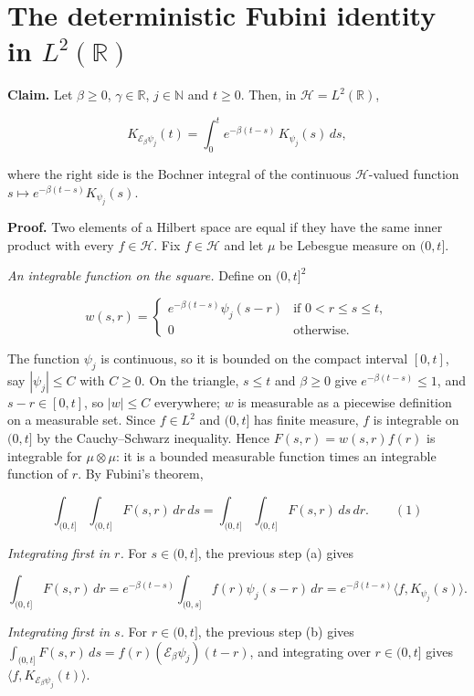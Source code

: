\documentclass[11pt,a4paper]{article}
\begin{document}
\section{\texorpdfstring{The deterministic Fubini identity in \(L^2(\mathbb R)\)}{The deterministic Fubini identity in L²(R)}}


\textbf{Claim.} Let \(\beta\ge0\), \(\gamma\in\mathbb R\), \(j\in\mathbb N\) and \(t\ge0\). Then, in \(\mathcal H=L^2(\mathbb R)\),


\[K_{\mathcal E_\beta\psi_j}(t)=\int_0^te^{-\beta(t-s)}\,K_{\psi_j}(s)\,ds,\]


where the right side is the Bochner integral of the continuous \(\mathcal H\)-valued function \(s\mapsto e^{-\beta(t-s)}K_{\psi_j}(s)\).




\textbf{Proof.} Two elements of a Hilbert space are equal if they have the same inner product with every \(f\in\mathcal H\). Fix \(f\in\mathcal H\) and let \(\mu\) be Lebesgue measure on \((0,t]\).




\emph{An integrable function on the square.} Define on \((0,t]^2\)


\[w(s,r)=\begin{cases}e^{-\beta(t-s)}\psi_j(s-r)&\text{if }0<r\le s\le t,\\0&\text{otherwise.}\end{cases}\]


The function \(\psi_j\) is continuous, so it is bounded on the compact interval \([0,t]\), say \(|\psi_j|\le C\) with \(C\ge0\). On the triangle, \(s\le t\) and \(\beta\ge0\) give \(e^{-\beta(t-s)}\le1\), and \(s-r\in[0,t]\), so \(|w|\le C\) everywhere; \(w\) is measurable as a piecewise definition on a measurable set. Since \(f\in L^2\) and \((0,t]\) has finite measure, \(f\) is integrable on \((0,t]\) by the Cauchy–Schwarz inequality. Hence \(F(s,r)=w(s,r)f(r)\) is integrable for \(\mu\otimes\mu\): it is a bounded measurable function times an integrable function of \(r\). By Fubini's theorem,


\[\int_{(0,t]}\int_{(0,t]}F(s,r)\,dr\,ds=\int_{(0,t]}\int_{(0,t]}F(s,r)\,ds\,dr.\qquad(1)\]


\emph{Integrating first in \(r\).} For \(s\in(0,t]\), the previous step (a) gives


\[\int_{(0,t]}F(s,r)\,dr=e^{-\beta(t-s)}\int_{(0,s]}f(r)\psi_j(s-r)\,dr=e^{-\beta(t-s)}\langle f,K_{\psi_j}(s)\rangle.\]


\emph{Integrating first in \(s\).} For \(r\in(0,t]\), the previous step (b) gives \(\int_{(0,t]}F(s,r)\,ds=f(r)(\mathcal E_\beta\psi_j)(t-r)\), and integrating over \(r\in(0,t]\) gives \(\langle f,K_{\mathcal E_\beta\psi_j}(t)\rangle\).
\end{document}

